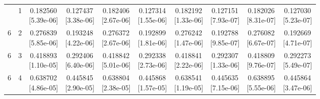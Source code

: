 \documentclass[12pt,letterpaper]{article}
\theoremstyle{plain}
\theoremstyle{definition}
\begin{document}
\begin{table}[p]
\begin{adjustbox}{max width=\linewidth}
\begin{tabular}{@{}rr*{8}{c}@{}}
\addlinespace[2pt]
6 & 1 & \shortstack{0.182560\\[-1pt]{\scriptsize[5.39e-06]}} & \shortstack{0.127437\\[-1pt]{\scriptsize[3.38e-06]}} & \shortstack{0.182406\\[-1pt]{\scriptsize[2.67e-06]}} & \shortstack{0.127314\\[-1pt]{\scriptsize[1.55e-06]}} & \shortstack{0.182192\\[-1pt]{\scriptsize[1.33e-06]}} & \shortstack{0.127151\\[-1pt]{\scriptsize[7.93e-07]}} & \shortstack{0.182026\\[-1pt]{\scriptsize[8.31e-07]}} & \shortstack{0.127030\\[-1pt]{\scriptsize[5.23e-07]}}\\
6 & 2 & \shortstack{0.276839\\[-1pt]{\scriptsize[5.85e-06]}} & \shortstack{0.193248\\[-1pt]{\scriptsize[4.22e-06]}} & \shortstack{0.276372\\[-1pt]{\scriptsize[2.67e-06]}} & \shortstack{0.192899\\[-1pt]{\scriptsize[1.81e-06]}} & \shortstack{0.276242\\[-1pt]{\scriptsize[1.47e-06]}} & \shortstack{0.192788\\[-1pt]{\scriptsize[9.85e-07]}} & \shortstack{0.276082\\[-1pt]{\scriptsize[6.67e-07]}} & \shortstack{0.192669\\[-1pt]{\scriptsize[4.71e-07]}}\\
6 & 3 & \shortstack{0.418893\\[-1pt]{\scriptsize[1.10e-05]}} & \shortstack{0.292406\\[-1pt]{\scriptsize[6.40e-06]}} & \shortstack{0.418842\\[-1pt]{\scriptsize[5.01e-06]}} & \shortstack{0.292338\\[-1pt]{\scriptsize[2.73e-06]}} & \shortstack{0.418841\\[-1pt]{\scriptsize[2.22e-06]}} & \shortstack{0.292307\\[-1pt]{\scriptsize[1.33e-06]}} & \shortstack{0.418809\\[-1pt]{\scriptsize[9.76e-07]}} & \shortstack{0.292273\\[-1pt]{\scriptsize[5.49e-07]}}\\
6 & 4 & \shortstack{0.638702\\[-1pt]{\scriptsize[4.86e-05]}} & \shortstack{0.445845\\[-1pt]{\scriptsize[2.90e-05]}} & \shortstack{0.638804\\[-1pt]{\scriptsize[2.38e-05]}} & \shortstack{0.445868\\[-1pt]{\scriptsize[1.57e-05]}} & \shortstack{0.638541\\[-1pt]{\scriptsize[1.19e-05]}} & \shortstack{0.445635\\[-1pt]{\scriptsize[7.15e-06]}} & \shortstack{0.638895\\[-1pt]{\scriptsize[5.55e-06]}} & \shortstack{0.445864\\[-1pt]{\scriptsize[3.47e-06]}}\\

\end{tabular}
\end{adjustbox}
\end{table}
\end{document}
